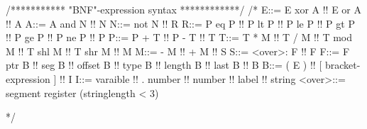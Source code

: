 
/*********** "BNF"-expression syntax ************/
/*
E::= E xor A !! E or A !! A
A::= A and N !! N
N::= not N !! R
R::= P eq P !! P lt P !! P le P !! P gt P !! P ge P !! P ne P !! P
P::= P + T !! P - T !! T
T::= T * M !! T / M !! T mod M !! T shl M !! T shr M !! M
M::= - M !! + M !! S
S::= <over>: F !! F
F::= F ptr B !! seg B !! offset B !! type B !!
     length B !! last B !! B
B::= ( E ) !! [ bracket-expression ] !! I
I::= varaible !! . number !! number !! label !! string
<over>::= segment register
(stringlength < 3)

*/

